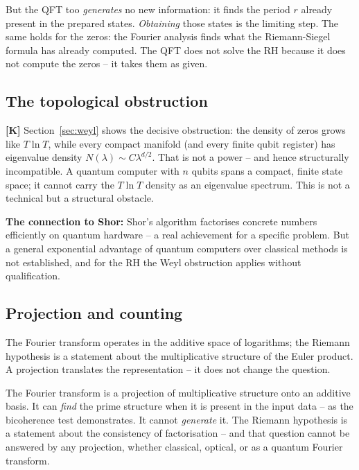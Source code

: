 But the QFT too \emph{generates} no new information: it finds the period
$r$ already present in the prepared states. \emph{Obtaining} those states
is the limiting step. The same holds for the zeros: the Fourier analysis
finds what the Riemann-Siegel formula has already computed. The QFT does
not solve the RH because it does not compute the zeros -- it takes them as
given.

\subsection{The topological obstruction}

\textbf{[K]} Section~\ref{sec:weyl} shows the decisive obstruction: the
density of zeros grows like $T\ln T$, while every compact manifold (and
every finite qubit register) has eigenvalue density $N(\lambda) \sim
C\lambda^{d/2}$. That is not a power -- and hence structurally incompatible.
A quantum computer with $n$ qubits spans a compact, finite state space; it
cannot carry the $T\ln T$ density as an eigenvalue spectrum. This is not a
technical but a structural obstacle.

\textbf{The connection to Shor:} Shor's algorithm factorises concrete
numbers efficiently on quantum hardware -- a real achievement for a specific
problem. But a general exponential advantage of quantum computers over
classical methods is not established, and for the RH the Weyl obstruction
applies without qualification.

\subsection{Projection and counting}

The Fourier transform operates in the additive space of logarithms; the
Riemann hypothesis is a statement about the multiplicative structure of the
Euler product. A projection translates the representation -- it does not
change the question.

\begin{highlight}
The Fourier transform is a projection of multiplicative structure onto an
additive basis. It can \emph{find} the prime structure when it is present in
the input data -- as the bicoherence test demonstrates. It cannot
\emph{generate} it. The Riemann hypothesis is a statement about the
consistency of factorisation -- and that question cannot be answered by any
projection, whether classical, optical, or as a quantum Fourier transform.
\end{highlight}

